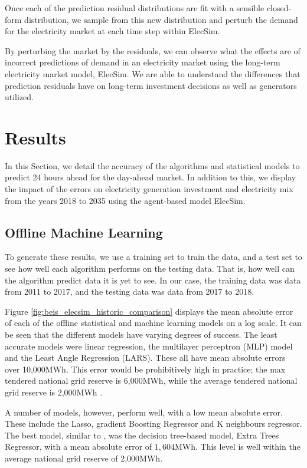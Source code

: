 \documentclass[final,3p,times,twocolumn,numbers]{elsarticle}
\begin{document}
Once each of the prediction residual distributions are fit with a sensible closed-form distribution, we sample from this new distribution and perturb the demand for the electricity market at each time step within ElecSim.

By perturbing the market by the residuals, we can observe what the effects are of incorrect predictions of demand in an electricity market using the long-term electricity market model, ElecSim. We are able to understand the differences that prediction residuals have on long-term investment decisions as well as generators utilized.




\section{Results}
\label{sec:results}

In this Section, we detail the accuracy of the algorithms and statistical models to predict 24 hours ahead for the day-ahead market. In addition to this, we display the impact of the errors on electricity generation investment and electricity mix from the years 2018 to 2035 using the agent-based model ElecSim.



\subsection{Offline Machine Learning}

To generate these results, we use a training set to train the data, and a test set to see how well each algorithm performs on the testing data. That is, how well can the algorithm predict data it is yet to see. In our case, the training data was data from 2011 to 2017, and the testing data was data from 2017 to 2018.

Figure \ref{fig:beis_elecsim_historic_comparison} displays the mean absolute error of each of the offline statistical and machine learning models on a log scale. It can be seen that the different models have varying degrees of success. The least accurate models were linear regression, the multilayer perceptron (MLP) model and the Least Angle Regression (LARS). These all have mean absolute errors over 10,000MWh. This error would be prohibitively high in practice; the max tendered national grid reserve is 6,000MWh, while the average tendered national grid reserve is 2,000MWh \cite{ESO2019}.

A number of models, however, perform well, with a low mean absolute error. These include the Lasso, gradient Boosting Regressor and K neighbours regressor. The best model, similar to \cite{Kell2018a}, was the decision tree-based model, Extra Trees Regressor, with a mean absolute error of $1,604$MWh. This level is well within the average national grid reserve of 2,000MWh.
\end{document}

